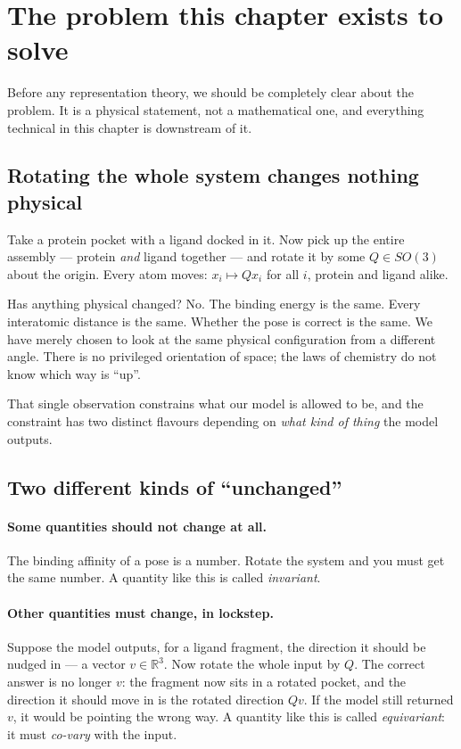 \documentclass[11pt,a4paper]{report}
\theoremstyle{definition}
\theoremstyle{remark}
\newcommand{\RR}{\mathbb R}
\begin{document}
\section{The problem this chapter exists to solve}
\label{sec:symmetry-problem}

Before any representation theory, we should be completely clear about the
problem. It is a physical statement, not a mathematical one, and everything
technical in this chapter is downstream of it.

\subsection{Rotating the whole system changes nothing physical}

Take a protein pocket with a ligand docked in it. Now pick up the entire
assembly --- protein \emph{and} ligand together --- and rotate it by some
$Q\in SO(3)$ about the origin. Every atom moves:
$x_i\mapsto Qx_i$ for all $i$, protein and ligand alike.

Has anything physical changed? No. The binding energy is the same. Every
interatomic distance is the same. Whether the pose is correct is the same.
We have merely chosen to look at the same physical configuration from a
different angle. There is no privileged orientation of space; the laws of
chemistry do not know which way is ``up''.

That single observation constrains what our model is allowed to be, and the
constraint has two distinct flavours depending on \emph{what kind of thing}
the model outputs.

\subsection{Two different kinds of ``unchanged''}

\paragraph{Some quantities should not change at all.} The binding affinity
of a pose is a number. Rotate the system and you must get the same number.
A quantity like this is called \emph{invariant}.

\paragraph{Other quantities must change, in lockstep.} Suppose the model
outputs, for a ligand fragment, the direction it should be nudged in --- a
vector $v\in\RR^3$. Now rotate the whole input by $Q$. The correct answer is
no longer $v$: the fragment now sits in a rotated pocket, and the direction
it should move in is the rotated direction $Qv$. If the model still returned
$v$, it would be pointing the wrong way. A quantity like this is called
\emph{equivariant}: it must \emph{co-vary} with the input.
\end{document}
